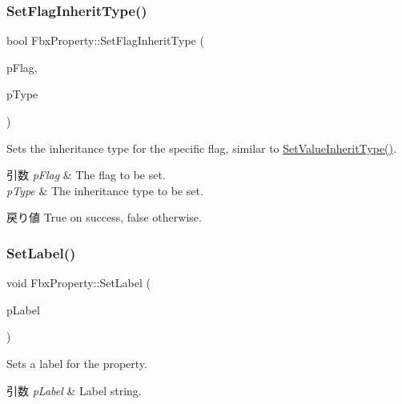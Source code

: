 \subsubsection{\texorpdfstring{Set\+Flag\+Inherit\+Type()}{SetFlagInheritType()}}
{\footnotesize\ttfamily bool Fbx\+Property\+::\+Set\+Flag\+Inherit\+Type (\begin{DoxyParamCaption}\item[{\hyperlink{class_fbx_property_flags_afabfa7e0949aac8a7dcdf8a141867e99}{Fbx\+Property\+Flags\+::\+E\+Flags}}]{p\+Flag,  }\item[{\hyperlink{class_fbx_property_flags_ae3b667a4fcac4b827fa186a698fec2f8}{Fbx\+Property\+Flags\+::\+E\+Inherit\+Type}}]{p\+Type }\end{DoxyParamCaption})}

Sets the inheritance type for the specific flag, similar to \hyperlink{class_fbx_property_ad83cb36df88b5c088d955effd462d4be}{Set\+Value\+Inherit\+Type()}. 
\begin{DoxyParams}{引数}
{\em p\+Flag} & The flag to be set. \\
\hline
{\em p\+Type} & The inheritance type to be set. \\
\hline
\end{DoxyParams}
\begin{DoxyReturn}{戻り値}
{\ttfamily True} on success, {\ttfamily false} otherwise. 
\end{DoxyReturn}
\mbox{\label{class_fbx_property_a8ceef24a4b0e5838895962aaf0ad07ae}} 
\subsubsection{\texorpdfstring{Set\+Label()}{SetLabel()}}
{\footnotesize\ttfamily void Fbx\+Property\+::\+Set\+Label (\begin{DoxyParamCaption}\item[{const \hyperlink{class_fbx_string}{Fbx\+String} \&}]{p\+Label }\end{DoxyParamCaption})}

Sets a label for the property. 
\begin{DoxyParams}{引数}
{\em p\+Label} & Label string. \\
\hline
\end{DoxyParams}
\mbox{\label{class_fbx_property_acc29ebadc04e2fdd89f986d3faaff874}} 
